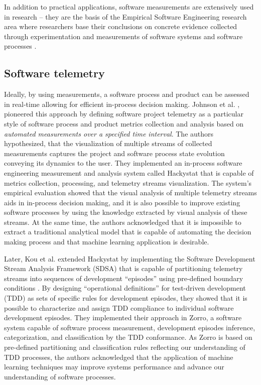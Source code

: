 In addition to practical applications, software measurements are extensively used in research --
they are the basis of the Empirical Software Engineering research area where researchers base their conclusions on 
concrete evidence collected through experimentation and measurements of software systems and software 
processes \cite{citeulike:766768}.

\subsection{Software telemetry}\label{section_software_telemetry}
Ideally, by using measurements, a software process and product can be assessed in real-time allowing for 
efficient in-process decision making.
Johnson et al. \cite{citeulike:557296}, pioneered this approach by defining software project telemetry as a 
particular style of software process and product metrics collection and analysis based on 
\textit{automated measurements over a specified time interval}. 
The authors hypothesized, that the visualization of multiple streams of collected measurements
captures the project and software process state evolution conveying its dynamics to the user.
They implemented an in-process software engineering measurement and analysis system called Hackystat 
\cite{citeulike:12929227} that is capable of metrics collection, processing, and telemetry streams visualization. 
The system's empirical evaluation showed that the visual analysis of multiple telemetry streams aids 
in in-process decision making, and it is also possible to improve existing software processes by using 
the knowledge extracted by visual analysis of these streams. 
At the same time, the authors acknowledged that it is impossible to extract a traditional analytical 
model that is capable of automating the decision making process and that machine learning application is 
desirable.

Later, Kou et al. extended Hackystat by implementing the 
Software Development Stream Analysis Framework (SDSA) 
that is capable of partitioning telemetry streams into sequences of development ``episodes'' using 
pre-defined boundary conditions \cite{citeulike:6180831} \cite{citeulike:11538873}.
By designing ``operational definitions'' for test-driven development (TDD) as sets of specific rules for 
development episodes, they showed that it is possible to characterize and assign TDD compliance to 
individual software development episodes.
They implemented their approach in Zorro, a software system capable of software process measurement, 
development episodes inference, categorization, and classification by the TDD conformance. 
As Zorro is based on pre-defined partitioning and classification rules reflecting our understanding of 
TDD processes, the authors acknowledged that the application of machine learning techniques may improve 
systems performance and advance our understanding of software processes.

